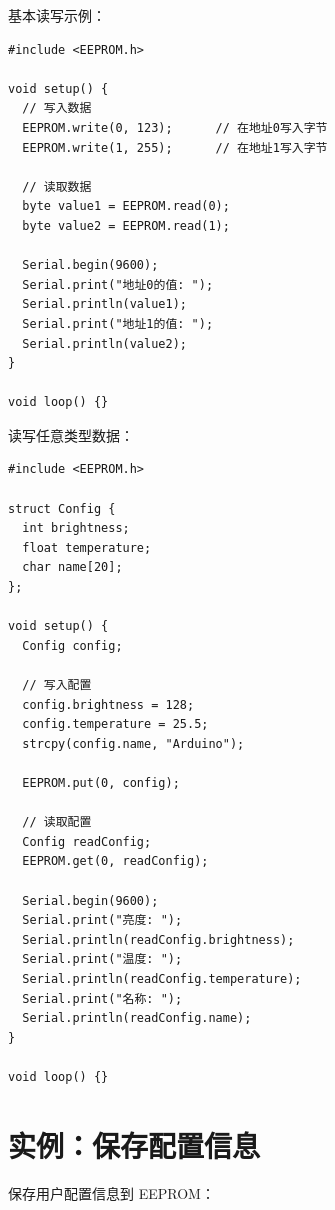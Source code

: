 \documentclass[12pt,UTF8]{ctexbook}
\begin{document}
基本读写示例：
\begin{lstlisting}
#include <EEPROM.h>

void setup() {
  // 写入数据
  EEPROM.write(0, 123);      // 在地址0写入字节
  EEPROM.write(1, 255);      // 在地址1写入字节
  
  // 读取数据
  byte value1 = EEPROM.read(0);
  byte value2 = EEPROM.read(1);
  
  Serial.begin(9600);
  Serial.print("地址0的值: ");
  Serial.println(value1);
  Serial.print("地址1的值: ");
  Serial.println(value2);
}

void loop() {}
\end{lstlisting}

读写任意类型数据：
\begin{lstlisting}
#include <EEPROM.h>

struct Config {
  int brightness;
  float temperature;
  char name[20];
};

void setup() {
  Config config;
  
  // 写入配置
  config.brightness = 128;
  config.temperature = 25.5;
  strcpy(config.name, "Arduino");
  
  EEPROM.put(0, config);
  
  // 读取配置
  Config readConfig;
  EEPROM.get(0, readConfig);
  
  Serial.begin(9600);
  Serial.print("亮度: ");
  Serial.println(readConfig.brightness);
  Serial.print("温度: ");
  Serial.println(readConfig.temperature);
  Serial.print("名称: ");
  Serial.println(readConfig.name);
}

void loop() {}
\end{lstlisting}

\section{实例：保存配置信息}

保存用户配置信息到 EEPROM：
\end{document}
